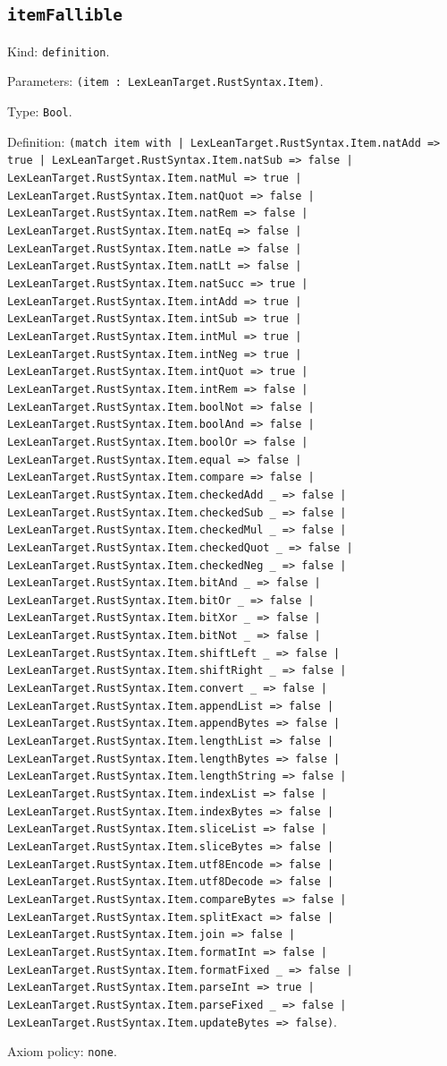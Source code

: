 \documentclass[11pt]{article}
\begin{document}
\subsection*{\texttt{itemFallible}}
\noindent Kind: \texttt{definition}.\par
\noindent Parameters: \texttt{(item : LexLeanTarget.RustSyntax.Item)}.\par
\noindent Type: \texttt{Bool}.\par
\noindent Definition: \texttt{(match item with | LexLeanTarget.RustSyntax.Item.natAdd => true | LexLeanTarget.RustSyntax.Item.natSub => false | LexLeanTarget.RustSyntax.Item.natMul => true | LexLeanTarget.RustSyntax.Item.natQuot => false | LexLeanTarget.RustSyntax.Item.natRem => false | LexLeanTarget.RustSyntax.Item.natEq => false | LexLeanTarget.RustSyntax.Item.natLe => false | LexLeanTarget.RustSyntax.Item.natLt => false | LexLeanTarget.RustSyntax.Item.natSucc => true | LexLeanTarget.RustSyntax.Item.intAdd => true | LexLeanTarget.RustSyntax.Item.intSub => true | LexLeanTarget.RustSyntax.Item.intMul => true | LexLeanTarget.RustSyntax.Item.intNeg => true | LexLeanTarget.RustSyntax.Item.intQuot => true | LexLeanTarget.RustSyntax.Item.intRem => false | LexLeanTarget.RustSyntax.Item.boolNot => false | LexLeanTarget.RustSyntax.Item.boolAnd => false | LexLeanTarget.RustSyntax.Item.boolOr => false | LexLeanTarget.RustSyntax.Item.equal => false | LexLeanTarget.RustSyntax.Item.compare => false | LexLeanTarget.RustSyntax.Item.checkedAdd \_ => false | LexLeanTarget.RustSyntax.Item.checkedSub \_ => false | LexLeanTarget.RustSyntax.Item.checkedMul \_ => false | LexLeanTarget.RustSyntax.Item.checkedQuot \_ => false | LexLeanTarget.RustSyntax.Item.checkedNeg \_ => false | LexLeanTarget.RustSyntax.Item.bitAnd \_ => false | LexLeanTarget.RustSyntax.Item.bitOr \_ => false | LexLeanTarget.RustSyntax.Item.bitXor \_ => false | LexLeanTarget.RustSyntax.Item.bitNot \_ => false | LexLeanTarget.RustSyntax.Item.shiftLeft \_ => false | LexLeanTarget.RustSyntax.Item.shiftRight \_ => false | LexLeanTarget.RustSyntax.Item.convert \_ => false | LexLeanTarget.RustSyntax.Item.appendList => false | LexLeanTarget.RustSyntax.Item.appendBytes => false | LexLeanTarget.RustSyntax.Item.lengthList => false | LexLeanTarget.RustSyntax.Item.lengthBytes => false | LexLeanTarget.RustSyntax.Item.lengthString => false | LexLeanTarget.RustSyntax.Item.indexList => false | LexLeanTarget.RustSyntax.Item.indexBytes => false | LexLeanTarget.RustSyntax.Item.sliceList => false | LexLeanTarget.RustSyntax.Item.sliceBytes => false | LexLeanTarget.RustSyntax.Item.utf8Encode => false | LexLeanTarget.RustSyntax.Item.utf8Decode => false | LexLeanTarget.RustSyntax.Item.compareBytes => false | LexLeanTarget.RustSyntax.Item.splitExact => false | LexLeanTarget.RustSyntax.Item.join => false | LexLeanTarget.RustSyntax.Item.formatInt => false | LexLeanTarget.RustSyntax.Item.formatFixed \_ => false | LexLeanTarget.RustSyntax.Item.parseInt => true | LexLeanTarget.RustSyntax.Item.parseFixed \_ => false | LexLeanTarget.RustSyntax.Item.updateBytes => false)}.\par
\noindent Axiom policy: \texttt{none}.\par
\end{document}
